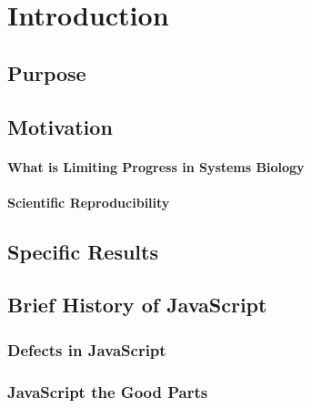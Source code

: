 \chapter{Introduction}

\section{Purpose}

\section{Motivation}

\subsubsection{What is Limiting Progress in Systems Biology}

\subsubsection{Scientific Reproducibility}

\section{Specific Results}

\section{Brief History of JavaScript}


\subsection{Defects in JavaScript}
\subsection{JavaScript the Good Parts}